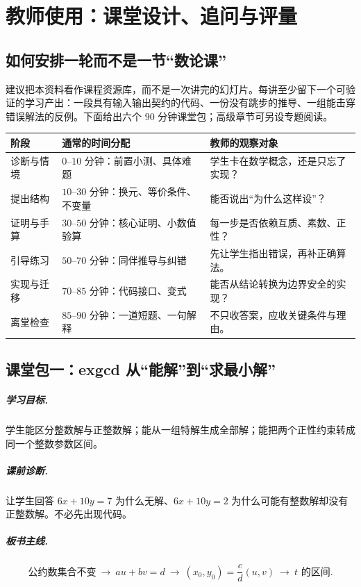 \documentclass[UTF8,a4paper,11pt,oneside,openany,fontset=fandol]{ctexbook}
\theoremstyle{definition}
\begin{document}
\chapter{教师使用：课堂设计、追问与评量}
\section{如何安排一轮而不是一节“数论课”}
建议把本资料看作课程资源库，而不是一次讲完的幻灯片。每讲至少留下一个可验证的学习产出：一段具有输入输出契约的代码、一份没有跳步的推导、一组能击穿错误解法的反例。下面给出六个 $90$ 分钟课堂包；高级章节可另设专题阅读。

\begin{longtable}{p{}p{}p{}}
\toprule
阶段 & 通常的时间分配 & 教师的观察对象\\\midrule
诊断与情境 & $0$--$10$ 分钟：前置小测、具体难题 & 学生卡在数学概念，还是只忘了实现？\\
提出结构 & $10$--$30$ 分钟：换元、等价条件、不变量 & 能否说出“为什么这样设”？\\
证明与手算 & $30$--$50$ 分钟：核心证明、小数值验算 & 每一步是否依赖互质、素数、正性？\\
引导练习 & $50$--$70$ 分钟：同伴推导与纠错 & 先让学生指出错误，再补正确算法。\\
实现与迁移 & $70$--$85$ 分钟：代码接口、变式 & 能否从结论转换为边界安全的实现？\\
离堂检查 & $85$--$90$ 分钟：一道短题、一句解释 & 不只收答案，应收关键条件与理由。\\
\bottomrule
\end{longtable}

\section{课堂包一：exgcd 从“能解”到“求最小解”}
\paragraph{学习目标.} 学生能区分整数解与正整数解；能从一组特解生成全部解；能把两个正性约束转成同一个整数参数区间。
\paragraph{课前诊断.} 让学生回答 $6x+10y=7$ 为什么无解、$6x+10y=2$ 为什么可能有整数解却没有正整数解。不必先出现代码。
\paragraph{板书主线.}
\[
\text{公约数集合不变}\ \longrightarrow\ au+bv=d
\ \longrightarrow\ (x_0,y_0)=\frac cd(u,v)
\ \longrightarrow\ t\text{ 的区间}.
\]
\end{document}
